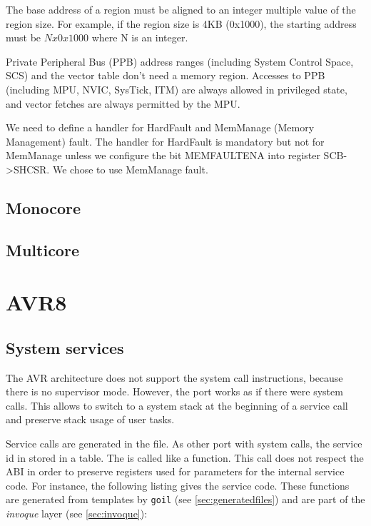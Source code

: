The base address of a region must be aligned to an integer multiple value of the region size.
For example, if the region size is 4KB (0x1000), the starting address must be $N x 0x1000$ where N is an integer.

Private Peripheral Bus (PPB) address ranges (including System Control Space, SCS) and the vector table don't need a memory region.
Accesses to PPB (including MPU, NVIC, SysTick, ITM) are always allowed in privileged state, and vector fetches are always permitted by the MPU.

We need to define a handler for HardFault and MemManage (Memory Management) fault. The handler for HardFault is mandatory but not for MemManage unless we configure the bit MEMFAULTENA into register SCB->SHCSR.
We chose to use MemManage fault.

\subsection{Monocore}

\subsection{Multicore}


\section{AVR8}
\label{sec:avr8port}

\subsection{System services} \label{sec:avr8portSystemService}

The AVR architecture does not support the system call instructions, because there is no supervisor mode. However, the port works as if there were system calls. This allows to switch to a system stack at the beginning of a service call and preserve stack usage of user tasks. 

Service calls are generated in the  file. As other port with system calls, the service id in stored in a table. The  is called like a function. This call does not respect the ABI in order to preserve registers used for parameters for the internal service code. For instance, the following listing gives the  service code. These functions are generated from templates by \texttt{goil} (see \ref{sec:generatedfiles}) and are part of the {\em invoque} layer (see \ref{sec:invoque}):

